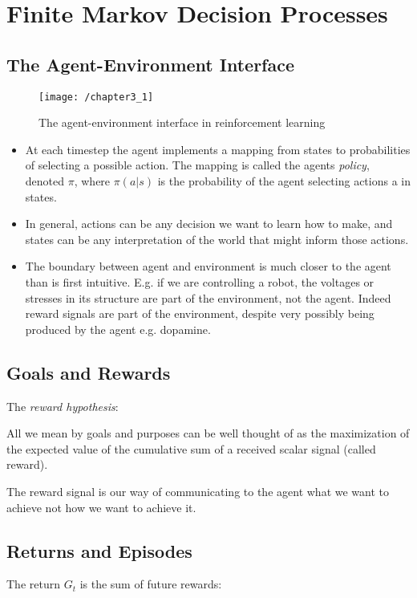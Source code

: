 \section{Finite Markov Decision Processes}

\subsection{The Agent-Environment Interface}
\begin{figure}[h!]
	\centering
	\texttt{[image: /chapter3\_1]}
	\caption{The agent-environment interface in reinforcement learning}
	\label{fig:agent-environment}
\end{figure}

\begin{itemize}
	\item At each timestep the agent implements a mapping from states to probabilities of selecting a possible action. The mapping is called the agents \textit{policy}, denoted \(\pi\), where \(\pi(a | s)\) is the probability of the agent selecting actions a in states.
	\item In general, actions can be any decision we want to learn how to make, and states can be any interpretation of the world that might inform those actions.
	\item The boundary between agent and environment is much closer to the agent than is first intuitive. E.g. if we are controlling a robot, the voltages or stresses in its structure are part of the environment, not the agent. Indeed reward signals are part of the environment, despite very possibly being produced by the agent e.g. dopamine.
\end{itemize}

\subsection{Goals and Rewards}
The \textit{reward hypothesis}:
\begin{displayquote}
	All we mean by goals and purposes can be well thought of as the maximization of the expected value of the cumulative sum of a received scalar signal (called reward).
\end{displayquote}

The reward signal is our way of communicating to the agent what we want to achieve not how we want to achieve it.

\subsection{Returns and Episodes}
The return \(G_t\) is the sum of future rewards:


